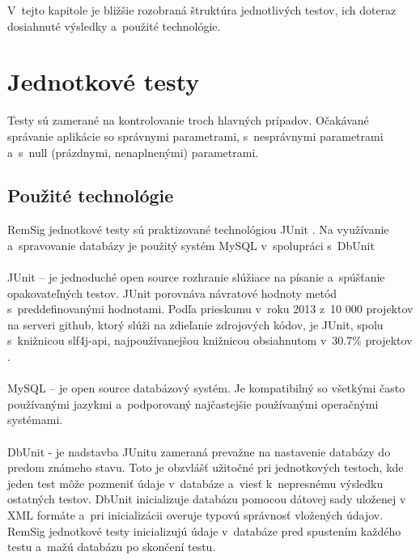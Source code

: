 \documentclass[
  digital, %
  table,   %
oneside,
  nolof,     %
  nolot,     %
]{fithesis3}
\begin{document}
  V~tejto kapitole je bližšie rozobraná štruktúra jednotlivých testov, ich doteraz dosiahnuté výsledky a~použité technológie.
\section{Jednotkové testy}
Testy sú zamerané na kontrolovanie troch hlavných prípadov. Očakávané správanie aplikácie so správnymi parametrami, s~nesprávnymi parametrami a~s~null (prázdnymi, nenaplnenými) parametrami.
\subsection{Použité technológie}
RemSig jednotkové testy sú praktizované technológiou  JUnit \cite{junit}. Na využívanie a~spravovanie databázy je použitý systém MySQL \cite{mySqlBible} v~spolupráci s~DbUnit \cite{dbunit}\paragraph{}
JUnit – je jednoduché open source rozhranie slúžiace na písanie a~spúšťanie opakovateľných testov. JUnit porovnáva návratové hodnoty metód s~preddefinovanými hodnotami. Podľa prieskumu v~roku 2013 z~10 000 projektov na serveri github, ktorý slúži na zdieľanie zdrojových kódov, je JUnit, spolu s~knižnicou slf4j-api, najpoužívanejšou knižnicou obsiahnutom v~30.7\% projektov \cite{gitHubAnalysis}. \paragraph{}
MySQL – je open source databázový systém. Je kompatibilný so všetkými často používanými jazykmi a~podporovaný najčastejšie používanými operačnými systémami.
\paragraph{}
DbUnit -  je nadstavba JUnitu zameraná prevažne na nastavenie databázy do predom známeho stavu. Toto je obzvlášť užitočné pri jednotkových testoch, kde jeden test môže pozmeniť údaje v~databáze a~viesť k~nepresnému výsledku ostatných testov. DbUnit inicializuje databázu pomocou  dátovej sady uloženej v XML formáte a~pri inicializácii overuje typovú správnosť vložených údajov. 
RemSig jednotkové testy inicializujú údaje v~databáze pred  spustením  každého testu a~mažú databázu po skončení testu.  
\end{document}
